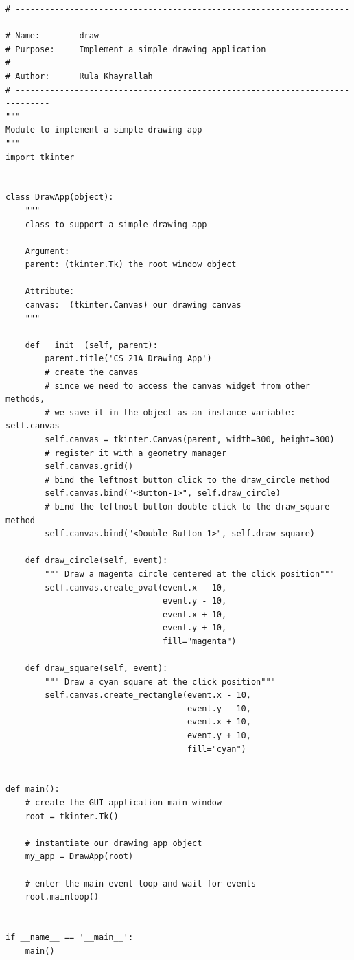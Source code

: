 \documentclass{article}
\begin{document}
\begin{lstlisting}
# -----------------------------------------------------------------------------
# Name:        draw
# Purpose:     Implement a simple drawing application
#
# Author:      Rula Khayrallah
# -----------------------------------------------------------------------------
"""
Module to implement a simple drawing app
"""
import tkinter


class DrawApp(object):
    """
    class to support a simple drawing app

    Argument:
    parent: (tkinter.Tk) the root window object

    Attribute:
    canvas:  (tkinter.Canvas) our drawing canvas
    """

    def __init__(self, parent):
        parent.title('CS 21A Drawing App')
        # create the canvas
        # since we need to access the canvas widget from other methods,
        # we save it in the object as an instance variable: self.canvas
        self.canvas = tkinter.Canvas(parent, width=300, height=300)
        # register it with a geometry manager
        self.canvas.grid()
        # bind the leftmost button click to the draw_circle method
        self.canvas.bind("<Button-1>", self.draw_circle)
        # bind the leftmost button double click to the draw_square method
        self.canvas.bind("<Double-Button-1>", self.draw_square)

    def draw_circle(self, event):
        """ Draw a magenta circle centered at the click position"""
        self.canvas.create_oval(event.x - 10,
                                event.y - 10,
                                event.x + 10,
                                event.y + 10,
                                fill="magenta")

    def draw_square(self, event):
        """ Draw a cyan square at the click position"""
        self.canvas.create_rectangle(event.x - 10,
                                     event.y - 10,
                                     event.x + 10,
                                     event.y + 10,
                                     fill="cyan")


def main():
    # create the GUI application main window
    root = tkinter.Tk()

    # instantiate our drawing app object
    my_app = DrawApp(root)

    # enter the main event loop and wait for events
    root.mainloop()


if __name__ == '__main__':
    main()
\end{lstlisting}
\end{document}
